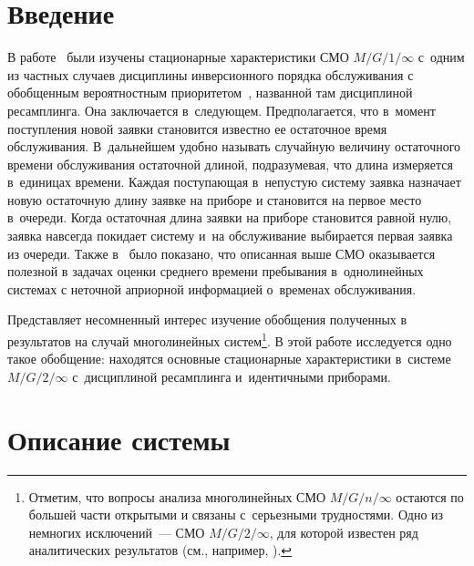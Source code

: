  
 



\thispagestyle{headings}

\begin{multicols}{2}

\label{st\stat}


\section{Введение}

В работе~\cite{xx2} были изучены стационарные характеристики СМО
 $M/G/1/\infty$ с~одним из частных случаев дисциплины инверсионного порядка обслуживания 
с обобщенным вероятностным приоритетом~\cite{xx3}, 
названной там дисциплиной ресамплинга. Она заключается в~следующем. 
Предполагается, что в~момент поступления новой заявки становится известно 
ее
остаточное время обслуживания.
В~дальнейшем удобно называть случайную величину остаточного времени 
обслуживания остаточной длиной, подразумевая, что длина измеряется 
в~единицах времени.
Каждая поступающая в~непустую систему заявка назначает новую остаточную 
длину заявке на приборе
и становится на первое место в~очереди. Когда остаточная длина заявки на 
приборе
становится равной нулю, заявка навсегда покидает систему и~на 
обслуживание
выбирается первая заявка из очереди. 
Также в~\cite{xx2,xx3,xx4,xx5,xx6} было показано, что описанная выше СМО 
оказывается полезной
в задачах оценки среднего времени пребывания в~однолинейных системах 
с неточной априорной информацией о~временах обслуживания. 

Представляет несомненный интерес изучение обобщения полученных 
в~\cite{xx2}
результатов на случай многолинейных систем\footnote[3]{Отметим, что вопросы
анализа многолинейных СМО $M/G/n/\infty$ остаются по большей части 
открытыми
и связаны с~серьезными трудностями. 
Одно из немногих исключений~--- СМО $M/G/2/\infty$, для которой известен 
ряд
аналитических результатов
(см., например, \cite{xx7,xx8,xx9}).}. В этой работе исследуется одно
такое обобщение: находятся основные стационарные характеристики в~системе
$M/G/2/\infty$ с~дисциплиной ресамплинга и~идентичными приборами. 



\section{Описание системы}


\end{multicols}
